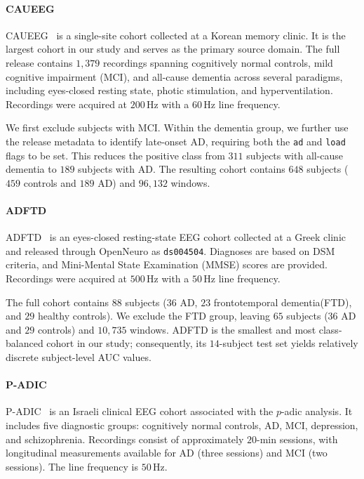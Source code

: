 \documentclass[letterpaper]{article} %
\begin{document}
\paragraph{CAUEEG}
CAUEEG~\cite{kim2023deep} is a single-site cohort collected at a Korean memory clinic. It is the largest cohort in our study and serves as the primary source domain. The full release contains $1{,}379$ recordings spanning cognitively normal controls, mild cognitive impairment (MCI), and all-cause dementia across several paradigms, including eyes-closed resting state, photic stimulation, and hyperventilation. Recordings were acquired at $200$\,Hz with a $60$\,Hz line frequency.

We first exclude subjects with MCI. Within the dementia group, we further use the release metadata to identify late-onset AD, requiring both the \texttt{ad} and \texttt{load} flags to be set. This reduces the positive class from $311$ subjects with all-cause dementia to $189$ subjects with AD. The resulting cohort contains $648$ subjects ($459$ controls and $189$ AD) and $96{,}132$ windows.

\paragraph{ADFTD}
ADFTD~\cite{miltiadous2023dataset} is an eyes-closed resting-state EEG cohort collected at a Greek clinic and released through OpenNeuro as \texttt{ds004504}. Diagnoses are based on DSM criteria, and Mini-Mental State Examination (MMSE) scores are provided. Recordings were acquired at $500$\,Hz with a $50$\,Hz line frequency.

The full cohort contains $88$ subjects ($36$ AD, $23$ frontotemporal dementia(FTD), and $29$ healthy controls). We exclude the FTD group, leaving $65$ subjects ($36$ AD and $29$ controls) and $10{,}735$ windows. ADFTD is the smallest and most class-balanced cohort in our study; consequently, its $14$-subject test set yields relatively discrete subject-level AUC values.

\paragraph{P-ADIC}
P-ADIC~\cite{shor2021eeg} is an Israeli clinical EEG cohort associated with the $p$-adic analysis. It includes five diagnostic groups: cognitively normal controls, AD, MCI, depression, and schizophrenia. Recordings consist of approximately $20$-min sessions, with longitudinal measurements available for AD (three sessions) and MCI (two sessions). The line frequency is $50$\,Hz.
\end{document}
